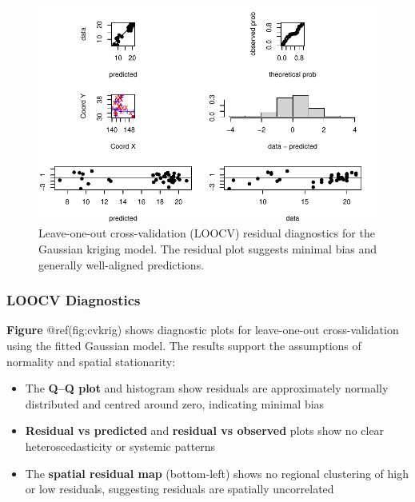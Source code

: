 \documentclass[
  11pt,
]{article}
\begin{document}
\begin{figure}[H]

{\centering \includegraphics{project_files/figure-pdf/fig-cvkrig-1.pdf}

}

\caption{Leave-one-out cross-validation (LOOCV) residual diagnostics for
the Gaussian kriging model. The residual plot suggests minimal bias and
generally well-aligned predictions.}

\end{figure}%

\subsubsection{\texorpdfstring{\textbf{LOOCV
Diagnostics}}{LOOCV Diagnostics}}\label{loocv-diagnostics}

\textbf{Figure} @ref(fig:cvkrig) shows diagnostic plots for
leave-one-out cross-validation using the fitted Gaussian model. The
results support the assumptions of normality and spatial stationarity:

\begin{itemize}
\item
  The \textbf{Q--Q plot} and histogram show residuals are approximately
  normally distributed and centred around zero, indicating minimal bias
\item
  \textbf{Residual vs predicted} and \textbf{residual vs observed} plots
  show no clear heteroscedasticity or systemic patterns
\item
  The \textbf{spatial residual map} (bottom-left) shows no regional
  clustering of high or low residuals, suggesting residuals are
  spatially uncorrelated
\end{itemize}
\end{document}
